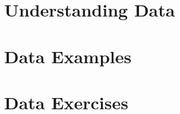 \clearpage
\def\pageLang{none}
\section{Understanding Data} %
\label{sec:understanding_dat}





\clearpage
\section{Data Examples} %
\label{sec:data_examples}




\clearpage
\section{Data Exercises} %
\label{sec:data_exercises}







